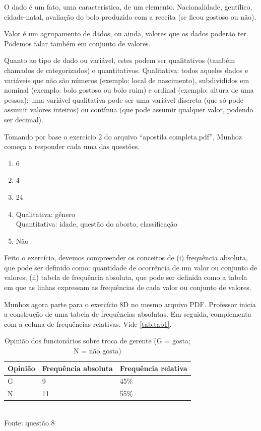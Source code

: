 \documentclass[a4paper]{article}
\begin{document}
	O dado é um fato, uma característica, de um elemento. Nacionalidade, gentílico, cidade-natal, avaliação do bolo produzido com a receita (se ficou gostoso ou não).
	
	Valor é um agrupamento de dados, ou ainda, valores que os dados poderão ter. Podemos falar também em conjunto de valores.
	
	Quanto ao tipo de dado ou variável, estes podem ser qualitativos (também chamados de categorizados) e quantitativos. Qualitativa: todos aqueles dados e variáveis que não são números (exemplo: local de nascimento), subdivididos em nominal (exemplo: bolo gostoso ou bolo ruim) e ordinal (exemplo: altura de uma pessoa); uma variável qualitativa pode ser uma variável discreta (que só pode assumir valores inteiros) ou contínua (que pode assumir qualquer valor, podendo ser decimal).
	
	Tomando por base o exercício 2 do arquivo ``apostila completa.pdf'', Munhoz começa a responder cada uma das questões.
	
	\begin{enumerate}[label=\alph*.]
		\item 6
		\item 4
		\item 24
		\item Qualitativa: gênero\\ Quantitativa: idade, questão do aborto, classificação
		\item Não
	\end{enumerate}
	
	Feito o exercício, devemos compreender os conceitos de (i) frequência absoluta, que pode ser definido como: quantidade de ocorrência de um valor ou conjunto de valores; (ii) tabela de frequência absoluta, que pode ser definida como a tabela em que as linhas expressam as frequências de cada valor ou conjunto de valores.
	
	Munhoz agora parte para o exercício 8D no mesmo arquivo PDF. Professor inicia a construção de uma tabela de frequências absolutas. Em seguida, complementa com a coluna de frequências relativas. Vide \autoref{tab:tab1}.
	
	\begin{table}[]
		\centering
		\caption{Opinião dos funcionários sobre troca de gerente (G = gosta; N = não gosta)}
		\begin{tabular}{|l|l|l|}
			\hline
			\textbf{Opinião} & \textbf{Frequência absoluta} & \textbf{Frequência relativa} \\ \hline
			G & 9 & 45\% \\ \hline
			N & 11 & 55\% \\ \hline
		\end{tabular}
		\\ \vspace{1mm} Fonte: questão 8
		\label{tab:tab1}
	\end{table}
	
\end{document}
